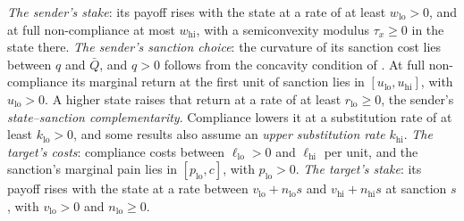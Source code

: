  \emph{The sender's stake}: its
payoff rises with the state at a rate of at least $w_{\mathrm{lo}}>0$, and at
full non-compliance at most $w_{\mathrm{hi}}$, with a semiconvexity modulus
$\tau_x\ge0$ in the state there. \emph{The sender's sanction choice}: the
curvature of its sanction cost lies between $q$ and $\bar Q$, and $q>0$ follows
from the concavity condition of . At full non-compliance
its marginal return at the first unit of sanction lies in
$[u_{\mathrm{lo}},u_{\mathrm{hi}}]$, with $u_{\mathrm{lo}}>0$. A higher state
raises that return at a rate of at least $r_{\mathrm{lo}}\ge0$, the sender's
\emph{state--sanction complementarity}. Compliance lowers it at a substitution rate
of at least $k_{\mathrm{lo}}>0$, and some results also assume an \emph{upper
substitution rate} $k_{\mathrm{hi}}$. \emph{The target's costs}: compliance costs
between $\ell_{\mathrm{lo}}>0$ and $\ell_{\mathrm{hi}}$ per unit, and the
sanction's marginal pain lies in $[p_{\mathrm{lo}},c]$, with $p_{\mathrm{lo}}>0$.
\emph{The target's stake}: its payoff rises with the state at a rate between
$v_{\mathrm{lo}}+n_{\mathrm{lo}}s$ and $v_{\mathrm{hi}}+n_{\mathrm{hi}}s$ at
sanction $s$, with $v_{\mathrm{lo}}>0$ and $n_{\mathrm{lo}}\ge0$.

